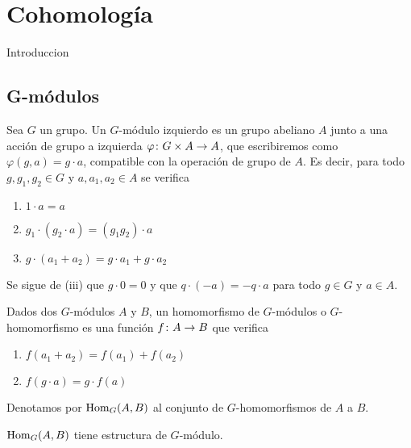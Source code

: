 
\chapter{Cohomología}

Introduccion 


\section{G-módulos}

\begin{definicion}
	Sea $G$ un grupo. Un $G$-módulo izquierdo es un grupo abeliano $A$ junto a una acción de grupo a izquierda $\varphi\colon G\times A\to A$, que escribiremos como $\varphi(g,a)=g\cdot a$, compatible con la operación de grupo de $A$. Es decir, para todo $g,g_1,g_2\in G$ y $a,a_1,a_2\in A$ se verifica
	\begin{enumerate}
		\item $1\cdot a=a$
		\item $g_1\cdot(g_2\cdot a)=(g_1g_2)\cdot a$
		\item $g\cdot (a_1+a_2)=g\cdot a_1+g\cdot a_2$
	\end{enumerate} 
	
	Se sigue de (iii) que $g\cdot 0 = 0$ y que $q\cdot (-a) = - q\cdot a$ para todo $g\in G$ y $a\in A$.
\end{definicion}

\begin{definicion}
	Dados dos $G$-módulos $A$ y $B$, un homomorfismo de $G$-módulos o $G$-homomorfismo es una función $f\colon A\to B$ que verifica
	\begin{enumerate}
		\item $f(a_1+a_2) = f(a_1)+f(a_2)$
		\item $f(g\cdot a) = g\cdot f(a)$
	\end{enumerate}
	
	Denotamos por $\operatorname{Hom}_G(A,B)$ al conjunto de $G$-homomorfismos de $A$ a $B$.
\end{definicion}

\begin{ejercicio}
	$\operatorname{Hom}_G(A,B)$ tiene estructura de $G$-módulo.
\end{ejercicio}

